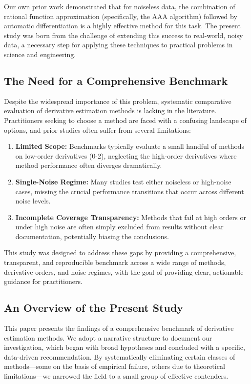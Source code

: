 Our own prior work demonstrated that for noiseless data, the combination of rational function approximation (specifically, the AAA algorithm) followed by automatic differentiation is a highly effective method for this task. The present study was born from the challenge of extending this success to real-world, noisy data, a necessary step for applying these techniques to practical problems in science and engineering.

\subsection{The Need for a Comprehensive Benchmark}
\label{sec:need_for_benchmark}

Despite the widespread importance of this problem, systematic comparative evaluation of derivative estimation methods is lacking in the literature. Practitioners seeking to choose a method are faced with a confusing landscape of options, and prior studies often suffer from several limitations:

\begin{enumerate}
    \item \textbf{Limited Scope:} Benchmarks typically evaluate a small handful of methods on low-order derivatives (0-2), neglecting the high-order derivatives where method performance often diverges dramatically.
    \item \textbf{Single-Noise Regime:} Many studies test either noiseless or high-noise cases, missing the crucial performance transitions that occur across different noise levels.
    \item \textbf{Incomplete Coverage Transparency:} Methods that fail at high orders or under high noise are often simply excluded from results without clear documentation, potentially biasing the conclusions.
\end{enumerate}

This study was designed to address these gaps by providing a comprehensive, transparent, and reproducible benchmark across a wide range of methods, derivative orders, and noise regimes, with the goal of providing clear, actionable guidance for practitioners.

\subsection{An Overview of the Present Study}
\label{sec:overview}

This paper presents the findings of a comprehensive benchmark of derivative estimation methods. We adopt a narrative structure to document our investigation, which began with broad hypotheses and concluded with a specific, data-driven recommendation. By systematically eliminating certain classes of methods—some on the basis of empirical failure, others due to theoretical limitations—we narrowed the field to a small group of effective contenders.

